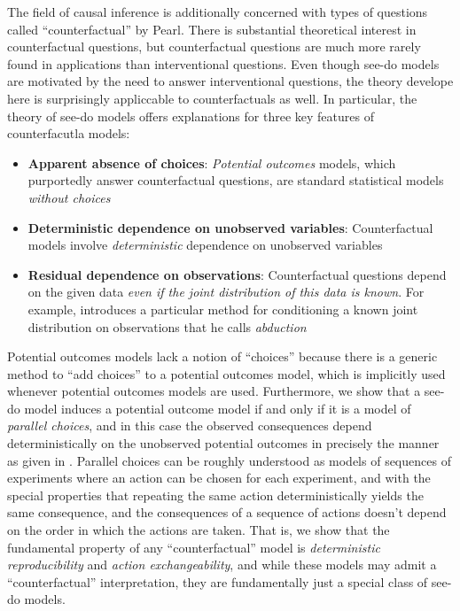 The field of causal inference is additionally concerned with types of questions called ``counterfactual'' by Pearl. There is substantial theoretical interest in counterfactual questions, but counterfactual questions are much more rarely found in applications than interventional questions. Even though see-do models are motivated by the need to answer interventional questions, the theory develope here is surprisingly appliccable to counterfactuals as well. In particular, the theory of see-do models offers explanations for three key features of counterfacutla models:
\begin{itemize}
    \item \textbf{Apparent absence of choices}: \emph{Potential outcomes} models, which purportedly answer counterfactual questions, are standard statistical models \emph{without choices} \citep{rubin_causal_2005}
    \item \textbf{Deterministic dependence on unobserved variables}: Counterfactual models involve \emph{deterministic} dependence on unobserved variables \citep{pearl_causality:_2009,rubin_causal_2005,richardson2013single}
    \item \textbf{Residual dependence on observations}: Counterfactual questions depend on the given data \emph{even if the joint distribution of this data is known}. For example, \citet{pearl_causality:_2009} introduces a particular method for conditioning a known joint distribution on observations that he calls \emph{abduction}
\end{itemize}

Potential outcomes models lack a notion of ``choices'' because there is a generic method to ``add choices'' to a potential outcomes model, which is implicitly used whenever potential outcomes models are used. Furthermore, we show that a see-do model induces a potential outcome model if and only if it is a model of \emph{parallel choices}, and in this case the observed consequences depend deterministically on the unobserved potential outcomes in precisely the manner as given in \citet{rubin_causal_2005}. Parallel choices can be roughly understood as models of sequences of experiments where an action can be chosen for each experiment, and with the special properties that repeating the same action deterministically yields the same consequence, and the consequences of a sequence of actions doesn't depend on the order in which the actions are taken. That is, we show that the fundamental property of any ``counterfactual'' model is \emph{deterministic reproducibility} and \emph{action exchangeability}, and while these models may admit a ``counterfactual'' interpretation, they are fundamentally just a special class of see-do models.

